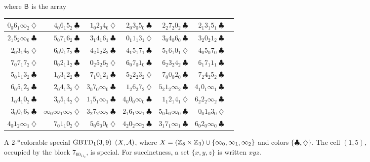 \documentclass[draft, 11pt]{article}
\begin{document}
\begin{figure}[t!]
\vskip 5pt
\normalsize \flushleft where ${\sf B}$ is the array
\vskip 5pt

\renewcommand{\arraystretch}{1.2}
 \setlength\tabcolsep{1pt}
 \centering
\begin{tabular}{|r|r|r| r|r|r|r| }
\hline
$0_0 6_1 \infty_2 ~ \diamondsuit$ &
$4_0 6_1 5_2 ~ \clubsuit$ &
$1_0 2_0 4_0 ~ \diamondsuit$ &
$2_0 3_0 5_0 ~ \clubsuit$ &
$2_2 7_2 0_2 ~ \clubsuit$ &
$2_1 3_1 5_1 ~ \clubsuit$ \\\hline
$2_1 5_2 \infty_0 ~ \clubsuit$ &
$5_0 7_1 6_2 ~ \clubsuit$ &
$3_1 4_1 6_1 ~ \clubsuit$ &
$0_1 1_1 3_1 ~ \diamondsuit$ &
$3_0 4_0 6_0 ~ \clubsuit$ &
$3_2 0_2 1_2 ~ \clubsuit$ \\\hline
$2_0 3_1 4_2 ~ \diamondsuit$ &
$6_0 0_1 7_2 ~ \clubsuit$ &
$4_2 1_2 2_2 ~ \clubsuit$ &
$4_1 5_1 7_1 ~ \clubsuit$ &
$5_1 6_1 0_1 ~ \diamondsuit$ &
$4_0 5_0 7_0 ~ \clubsuit$ \\\hline
$7_0 7_1 7_2 ~ \diamondsuit$ &
$0_0 2_1 1_2 ~ \clubsuit$ &
$0_2 5_2 6_2 ~ \diamondsuit$ &
$6_0 7_0 1_0 ~ \clubsuit$ &
$6_2 3_2 4_2 ~ \clubsuit$ &
$6_1 7_1 1_1 ~ \clubsuit$ \\\hline
$5_0 1_1 3_2 ~ \clubsuit$ &
$1_0 3_1 2_2 ~ \clubsuit$ &
$7_1 0_1 2_1 ~ \clubsuit$ &
$5_2 2_2 3_2 ~ \diamondsuit$ &
$7_0 0_0 2_0 ~ \clubsuit$ &
$7_2 4_2 5_2 ~ \clubsuit$ \\\hline
$6_0 5_1 2_2 ~ \clubsuit$ &
$2_0 4_1 3_2 ~ \diamondsuit$ &
$3_0 7_0 \infty_0 ~ \clubsuit$ &
$1_2 6_2 7_2 ~ \diamondsuit$ &
$5_2 1_2 \infty_2 ~ \clubsuit$ &
$4_1 0_1 \infty_1 ~ \clubsuit$ \\\hline
$1_0 4_1 0_2 ~ \clubsuit$ &
$3_0 5_1 4_2 ~ \diamondsuit$ &
$1_1 5_1 \infty_1 ~ \clubsuit$ &
$4_0 0_0 \infty_0 ~ \clubsuit$ &
$1_1 2_1 4_1 ~ \diamondsuit$ &
$6_2 2_2 \infty_2 ~ \clubsuit$ \\\hline
$3_0 0_1 6_2 ~ \clubsuit$ &
$\infty_0 \infty_1 \infty_2 ~ \diamondsuit$ &
$3_2 7_2 \infty_2 ~ \clubsuit$ &
$2_1 6_1 \infty_1 ~ \clubsuit$ &
$5_0 1_0 \infty_0 ~ \clubsuit$ &
$0_0 1_0 3_0 ~ \diamondsuit$ \\\hline
$4_0 1_2 \infty_1 ~ \diamondsuit$ &
$7_0 1_1 0_2 ~ \diamondsuit$ &
$5_0 6_0 0_0 ~ \diamondsuit$ &
$4_2 0_2 \infty_2 ~ \clubsuit$ &
$3_1 7_1 \infty_1 ~ \clubsuit$ &
$6_0 2_0 \infty_0 ~ \clubsuit$ \\\hline
\end{tabular}



\caption{A $2$-$*$colorable special ${\rm GBTD}_1(3,9)$ $(X,\mathcal A)$,
where $X=(\mathbb Z_8\times\mathbb Z_3)\cup\{\infty_0,\infty_1,\infty_2\}$ and colors $\{\clubsuit,\diamondsuit\}$. 
The cell $(1,5)$, %
occupied by the block $7_00_11_2$, is special. 
For succinctness, a set $\{x,y,z\}$ is written $xyz$. 
} \label{fig:gbtd27}
\end{figure}
\end{document}
